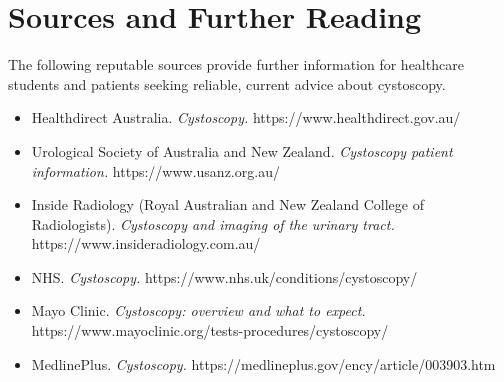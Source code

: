\section*{Sources and Further Reading}
The following reputable sources provide further information for healthcare students and patients seeking reliable, current advice about cystoscopy.

\begin{itemize}
    \item Healthdirect Australia. \textit{Cystoscopy.} https://www.healthdirect.gov.au/
    \item Urological Society of Australia and New Zealand. \textit{Cystoscopy patient information.} https://www.usanz.org.au/
    \item Inside Radiology (Royal Australian and New Zealand College of Radiologists). \textit{Cystoscopy and imaging of the urinary tract.} https://www.insideradiology.com.au/
    \item NHS. \textit{Cystoscopy.} https://www.nhs.uk/conditions/cystoscopy/
    \item Mayo Clinic. \textit{Cystoscopy: overview and what to expect.} https://www.mayoclinic.org/tests-procedures/cystoscopy/
    \item MedlinePlus. \textit{Cystoscopy.} https://medlineplus.gov/ency/article/003903.htm
\end{itemize}
